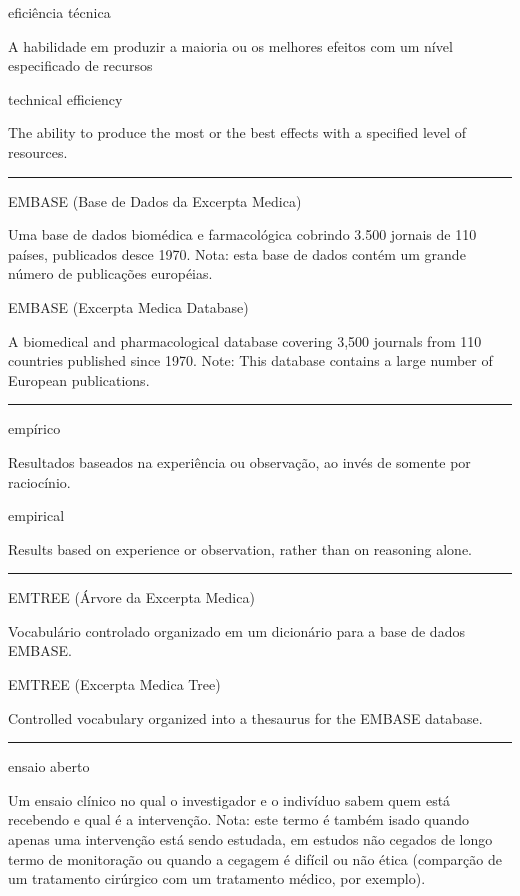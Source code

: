 \documentclass[
  openany]{book}
\begin{document}
eficiência técnica

A habilidade em produzir a maioria ou os melhores efeitos com um nível especificado de recursos

technical efficiency

The ability to produce the most or the best effects with a specified level of resources.

\begin{center}\rule{0.5\linewidth}{0.5pt}\end{center}

EMBASE (Base de Dados da Excerpta Medica)

Uma base de dados biomédica e farmacológica cobrindo 3.500 jornais de 110 países, publicados desce 1970. Nota: esta base de dados contém um grande número de publicações européias.

EMBASE (Excerpta Medica Database)

A biomedical and pharmacological database covering 3,500 journals from 110 countries published since 1970. Note: This database contains a large number of European publications.

\begin{center}\rule{0.5\linewidth}{0.5pt}\end{center}

empírico

Resultados baseados na experiência ou observação, ao invés de somente por raciocínio.

empirical

Results based on experience or observation, rather than on reasoning alone.

\begin{center}\rule{0.5\linewidth}{0.5pt}\end{center}

EMTREE (Árvore da Excerpta Medica)

Vocabulário controlado organizado em um dicionário para a base de dados EMBASE.

EMTREE (Excerpta Medica Tree)

Controlled vocabulary organized into a thesaurus for the EMBASE database.

\begin{center}\rule{0.5\linewidth}{0.5pt}\end{center}

ensaio aberto

Um ensaio clínico no qual o investigador e o indivíduo sabem quem está recebendo e qual é a intervenção. Nota: este termo é também isado quando apenas uma intervenção está sendo estudada, em estudos não cegados de longo termo de monitoração ou quando a cegagem é difícil ou não ética (comparção de um tratamento cirúrgico com um tratamento médico, por exemplo).
\end{document}

